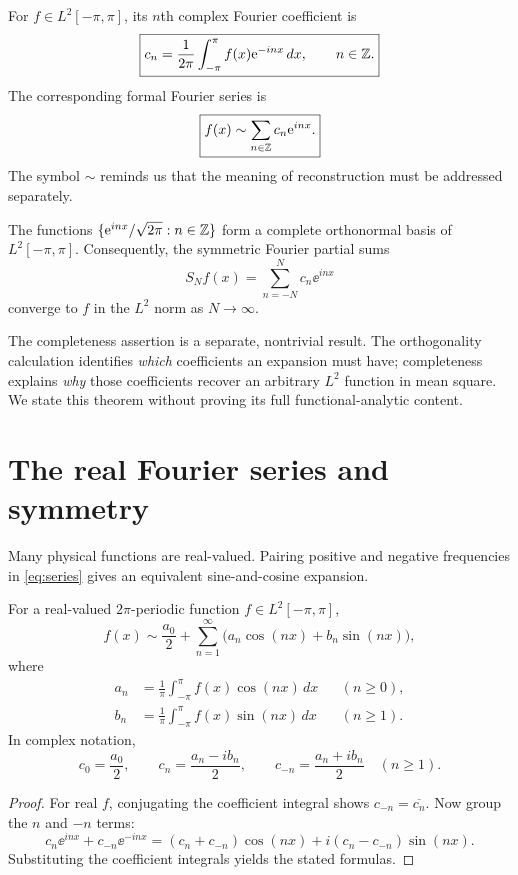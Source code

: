 \begin{definition}\label{def:fourier-coeff}
For $f\in L^2[-\pi,\pi]$, its $n$th complex Fourier coefficient is
\begin{equation}\label{eq:coefficients}
 \boxed{c_n=\frac{1}{2\pi}\int_{-\pi}^{\pi}f(x)\mathrm{e}^{-inx}\,dx,
 \qquad n\in\mathbb{Z}.}
\end{equation}
The corresponding formal Fourier series is
\begin{equation}\label{eq:series}
 \boxed{f(x)\sim\sum_{n\in\mathbb{Z}}c_n\mathrm{e}^{inx}.}
\end{equation}
The symbol $\sim$ reminds us that the meaning of reconstruction
must be addressed separately.
\end{definition}

\begin{theorem}\label{thm:completeness}
The functions $\{\mathrm{e}^{inx}/\sqrt{2\pi}:n\in\mathbb{Z}\}$ form a complete
orthonormal basis of $L^2[-\pi,\pi]$. Consequently, the symmetric
Fourier partial sums
\[
 S_Nf(x)=\sum_{n=-N}^{N}c_n\ee^{inx}
\]
converge to $f$ in the $L^2$ norm as $N\to\infty$.
\end{theorem}
The completeness assertion is a separate, nontrivial result.
The orthogonality calculation identifies \emph{which} coefficients an
expansion must have; completeness explains \emph{why} those coefficients
recover an arbitrary $L^2$ function in mean square. We state this theorem
without proving its full functional-analytic content.

\section{The real Fourier series and symmetry}
Many physical functions are real-valued. Pairing positive and negative
frequencies in \cref{eq:series} gives an equivalent sine-and-cosine expansion.

\begin{proposition}\label{prop:real}
For a real-valued $2\pi$-periodic function $f\in L^2[-\pi,\pi]$,
\begin{equation}\label{eq:real-series}
 f(x)\sim\frac{a_0}{2}
 +\sum_{n=1}^{\infty}\bigl(a_n\cos(nx)+b_n\sin(nx)\bigr),
\end{equation}
where
\begin{align}\label{eq:real-coeffs}
 a_n&=\frac{1}{\pi}\int_{-\pi}^{\pi}f(x)\cos(nx)\,dx
 &&(n\geq0),\\
 b_n&=\frac{1}{\pi}\int_{-\pi}^{\pi}f(x)\sin(nx)\,dx
 &&(n\geq1).
\end{align}
In complex notation,
\[
 c_0=\frac{a_0}{2},\qquad
 c_n=\frac{a_n-ib_n}{2},\qquad
 c_{-n}=\frac{a_n+ib_n}{2} \quad (n\geq1).
\]
\end{proposition}
\begin{proof}
For real $f$, conjugating the coefficient integral shows
$c_{-n}=\overline{c_n}$. Now group the $n$ and $-n$ terms:
\[
 c_n\ee^{inx}+c_{-n}\ee^{-inx}
 =(c_n+c_{-n})\cos(nx)+i(c_n-c_{-n})\sin(nx).
\]
Substituting the coefficient integrals yields the stated formulas.
\end{proof}

